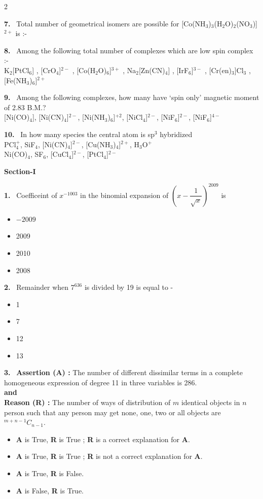 \documentclass[10pt]{extarticle}
\newcommand{\partsec}[2]{\par\medskip\noindent{\large\bfseries PART-#1: #2}\par\smallskip}
\newcommand{\sect}[1]{\par\smallskip\noindent\textbf{#1}\par}
\newcommand{\qn}[1]{\par\smallskip\noindent\textbf{#1.}~}
\newenvironment{qoptions}{\begin{itemize}[leftmargin=1.8em,itemsep=1pt,topsep=2pt,label={}]}{\end{itemize}}
\newcommand{\opt}[2]{\item[(#1)] #2}
\begin{document}
\begin{multicols}{2}
\qn{7} Total number of geometrical isomers are possible for [Co(NH$_3$)$_3$(H$_2$O)$_2$(NO$_3$)]$^{2+}$ is :-

\qn{8} Among the following total number of complexes which are low spin complex :-\\
K$_2$[PtCl$_6$] , [CrO$_4$]$^{2-}$ , [Co(H$_2$O)$_6$]$^{3+}$ , Na$_2$[Zn(CN)$_4$] , [IrF$_6$]$^{3-}$ , [Cr(en)$_3$]Cl$_3$ , [Fe(NH$_3$)$_6$]$^{2+}$

\qn{9} Among the following complexes, how many have `spin only' magnetic moment of 2.83 B.M.?\\[0pt]
[Ni(CO)$_4$], [Ni(CN)$_4$]$^{2-}$, [Ni(NH$_3$)$_6$]$^{+2}$, [NiCl$_4$]$^{2-}$, [NiF$_6$]$^{2-}$, [NiF$_6$]$^{4-}$

\qn{10} In how many species the central atom is sp$^3$ hybridized\\
PCl$_4^+$, SiF$_4$, [Ni(CN)$_4$]$^{2-}$, [Cu(NH$_3$)$_4$]$^{2+}$, H$_3$O$^+$\\
Ni(CO)$_4$, SF$_6$, [CuCl$_4$]$^{2-}$, [PtCl$_4$]$^{2-}$

\partsec{3}{MATHEMATICS}
\sect{Section-I}

\qn{1} Coefficeint of $x^{-1003}$ in the binomial expansion of $\left(x-\dfrac{1}{\sqrt x}\right)^{2009}$ is
\begin{qoptions}
\opt{A}{$-2009$}
\opt{B}{2009}
\opt{C}{2010}
\opt{D}{2008}
\end{qoptions}

\qn{2} Remainder when $7^{636}$ is divided by 19 is equal to -
\begin{qoptions}
\opt{A}{1}
\opt{B}{7}
\opt{C}{12}
\opt{D}{13}
\end{qoptions}

\qn{3} \textbf{Assertion (A) :} The number of different dissimilar terms in a complete homogeneous expression of degree 11 in three variables is 286.\\
\textbf{and}\\
\textbf{Reason (R) :} The number of ways of distribution of $m$ identical objects in $n$ person such that any person may get none, one, two or all objects are ${}^{m+n-1}C_{n-1}$.
\begin{qoptions}
\opt{A}{\textbf{A} is True, \textbf{R} is True ; \textbf{R} is a correct explanation for \textbf{A}.}
\opt{B}{\textbf{A} is True, \textbf{R} is True ; \textbf{R} is not a correct explanation for \textbf{A}.}
\opt{C}{\textbf{A} is True, \textbf{R} is False.}
\opt{D}{\textbf{A} is False, \textbf{R} is True.}
\end{qoptions}


\end{multicols}
\end{document}
